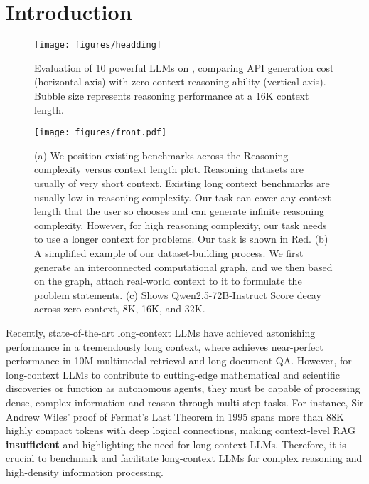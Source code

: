 \section{Introduction} 
\label{submission} 

\begin{wrapfigure}{r}{0.5\textwidth} 
    \texttt{[image: figures/headding]} 
     \vspace{-5mm}
    \caption{Evaluation of 10 powerful LLMs on \sysb, comparing API generation cost (horizontal axis) with zero-context reasoning ability (vertical axis). Bubble size represents reasoning performance at a 16K context length.} 
    \vspace{-5mm} 
\end{wrapfigure} 

\begin{figure*}[t] 
    \centering
    \texttt{[image: figures/front.pdf]} 
    \vspace{-5mm}
    \caption{(a) We position existing benchmarks across the Reasoning complexity versus context length plot. Reasoning datasets are usually of very short context. Existing long context benchmarks are usually low in reasoning complexity. Our task can cover any context length that the user so chooses and can generate infinite reasoning complexity. However, for high reasoning complexity, our task needs to use a longer context for problems. Our task is shown in Red. (b) A simplified example of our dataset-building process. We first generate an interconnected computational graph, and we then based on the graph, attach real-world context to it to formulate the problem statements. (c) Shows Qwen2.5-72B-Instruct Score decay across zero-context, 8K, 16K, and 32K.} 
    \label{figureone} 
    \vspace{-5mm}
\end{figure*} 

Recently, state-of-the-art long-context LLMs \citep{team2024gemini, minimax2025minimax01scalingfoundationmodels} have achieved astonishing performance in a tremendously long context, where \citet{team2024gemini} achieves near-perfect performance in 10M multimodal retrieval and long document QA. 
However, for long-context LLMs to contribute to cutting-edge mathematical and scientific discoveries or function as autonomous agents, they must be capable of processing dense, complex information and reason through multi-step tasks. 
For instance, Sir Andrew Wiles' proof \citep{wiles1995modular} of Fermat's Last Theorem in 1995 spans more than 88K highly compact tokens with deep logical connections, making context-level RAG~\citep{lewis2021retrievalaugmentedgenerationknowledgeintensivenlp} \textbf{insufficient} and highlighting the need for long-context LLMs. 
Therefore, it is crucial to benchmark and facilitate long-context LLMs for complex reasoning and high-density information processing.

